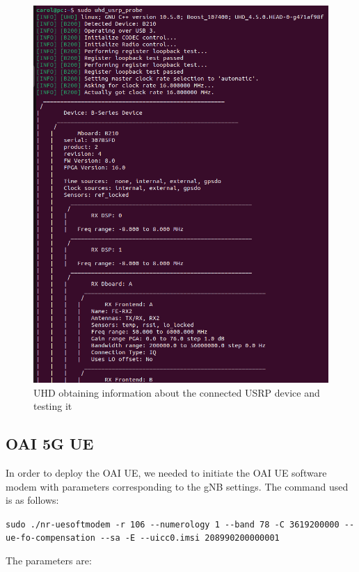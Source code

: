 \begin{figure}[H]
    \centering
    \includegraphics[width=0.5\linewidth]{figures/uhd_usrp_probe}
    \caption{UHD obtaining information about the connected USRP device and testing it}
    \label{fig:uhd_probe}
\end{figure}

\subsection{OAI 5G UE}\label{subsec:oai-5g-ue}
In order to deploy the OAI UE, we needed to initiate the OAI UE software modem with parameters corresponding to the gNB settings.
The command used is as follows:

\lstinline[columns=flexible,breaklines=true]{sudo ./nr-uesoftmodem -r 106 --numerology 1 --band 78 -C 3619200000 --ue-fo-compensation --sa -E --uicc0.imsi 208990200000001}


The parameters are:

